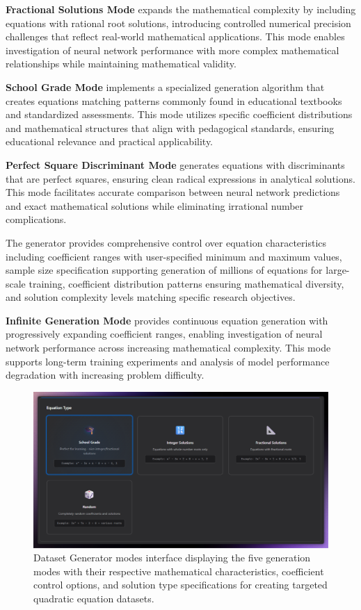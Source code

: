 \documentclass[11pt,a4paper]{report}
\begin{document}
\textbf{Fractional Solutions Mode} expands the mathematical complexity by including equations with rational root solutions, introducing controlled numerical precision challenges that reflect real-world mathematical applications. This mode enables investigation of neural network performance with more complex mathematical relationships while maintaining mathematical validity.

\textbf{School Grade Mode} implements a specialized generation algorithm that creates equations matching patterns commonly found in educational textbooks and standardized assessments. This mode utilizes specific coefficient distributions and mathematical structures that align with pedagogical standards, ensuring educational relevance and practical applicability.

\textbf{Perfect Square Discriminant Mode} generates equations with discriminants that are perfect squares, ensuring clean radical expressions in analytical solutions. This mode facilitates accurate comparison between neural network predictions and exact mathematical solutions while eliminating irrational number complications.

The generator provides comprehensive control over equation characteristics including coefficient ranges with user-specified minimum and maximum values, sample size specification supporting generation of millions of equations for large-scale training, coefficient distribution patterns ensuring mathematical diversity, and solution complexity levels matching specific research objectives.

\textbf{Infinite Generation Mode} provides continuous equation generation with progressively expanding coefficient ranges, enabling investigation of neural network performance across increasing mathematical complexity. This mode supports long-term training experiments and analysis of model performance degradation with increasing problem difficulty.

\begin{figure}[H]
\centering
\includegraphics[width=\textwidth]{quadratic_predictor_generation_modes.png}
\caption{Dataset Generator modes interface displaying the five generation modes with their respective mathematical characteristics, coefficient control options, and solution type specifications for creating targeted quadratic equation datasets.}
\label{fig:quadratic_generation_modes}
\end{figure}
\end{document}
